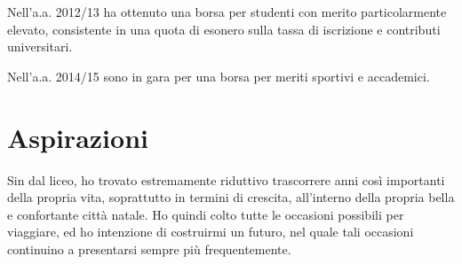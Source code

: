 \documentclass[11pt,a4paper,sans]{moderncv}        %
\begin{document}
Nell’a.a. 2012/13 ha ottenuto una borsa per studenti con merito particolarmente elevato, consistente in una quota di esonero sulla tassa di iscrizione e contributi universitari.

Nell’a.a. 2014/15 sono in gara per una borsa per meriti sportivi e accademici.
\nocite{*}

\section{Aspirazioni}
Sin dal liceo, ho trovato estremamente riduttivo trascorrere anni così importanti della propria vita, soprattutto in termini di crescita, all’interno della propria bella e confortante città natale. Ho quindi colto tutte le occasioni possibili  per viaggiare, ed ho intenzione di costruirmi un futuro, nel quale tali occasioni continuino a presentarsi sempre più frequentemente.




\end{document}
